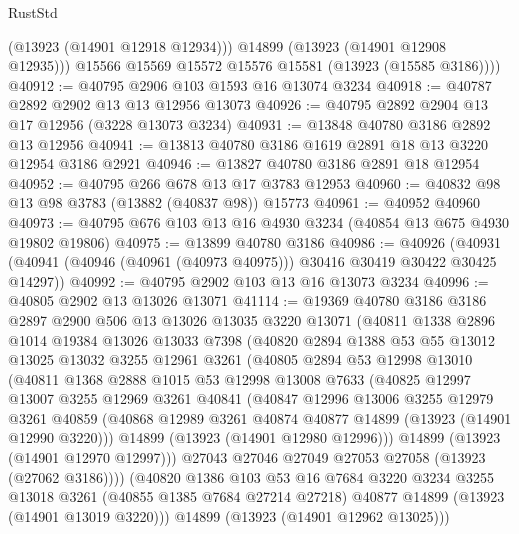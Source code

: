 \begin{lexlean}{RustStd}
\begin{coremodule}
            (@13923 (@14901 @12918 @12934)))
          @14899
          (@13923 (@14901 @12908 @12935)))
        @15566
        @15569
        @15572
        @15576
        @15581
        (@13923 (@15585 @3186))))
@40912 := @40795 @2906 @103 @1593 @16 @13074 @3234
@40918 := @40787 @2892 @2902 @13 @13 @12956 @13073
@40926 := @40795 @2892 @2904 @13 @17 @12956 (@3228 @13073 @3234)
@40931 := @13848 @40780 @3186 @2892 @13 @12956
@40941 := @13813 @40780 @3186 @1619 @2891 @18 @13 @3220 @12954 @3186 @2921
@40946 := @13827 @40780 @3186 @2891 @18 @12954
@40952 := @40795 @266 @678 @13 @17 @3783 @12953
@40960 := @40832 @98 @13 @98 @3783 (@13882 (@40837 @98)) @15773
@40961 := @40952 @40960
@40973 := @40795 @676 @103 @13 @16 @4930 @3234 (@40854 @13 @675 @4930 @19802 @19806)
@40975 := @13899 @40780 @3186
@40986 := @40926
    (@40931 (@40941 (@40946 (@40961 (@40973 @40975))) @30416 @30419 @30422 @30425 @14297))
@40992 := @40795 @2902 @103 @13 @16 @13073 @3234
@40996 := @40805 @2902 @13 @13026 @13071
@41114 := @19369
    @40780
    @3186
    @3186
    @2897
    @2900
    @506
    @13
    @13026
    @13035
    @3220
    @13071
    (@40811
      @1338
      @2896
      @1014
      @19384
      @13026
      @13033
      @7398
      (@40820
        @2894
        @1388
        @53
        @55
        @13012
        @13025
        @13032
        @3255
        @12961
        @3261
        (@40805
          @2894
          @53
          @12998
          @13010
          (@40811
            @1368
            @2888
            @1015
            @53
            @12998
            @13008
            @7633
            (@40825
              @12997
              @13007
              @3255
              @12969
              @3261
              @40841
              (@40847
                @12996
                @13006
                @3255
                @12979
                @3261
                @40859
                (@40868 @12989 @3261 @40874 @40877 @14899 (@13923 (@14901 @12990 @3220)))
                @14899
                (@13923 (@14901 @12980 @12996)))
              @14899
              (@13923 (@14901 @12970 @12997)))
            @27043
            @27046
            @27049
            @27053
            @27058
            (@13923 (@27062 @3186))))
        (@40820
          @1386
          @103
          @53
          @16
          @7684
          @3220
          @3234
          @3255
          @13018
          @3261
          (@40855 @1385 @7684 @27214 @27218)
          @40877
          @14899
          (@13923 (@14901 @13019 @3220)))
        @14899
        (@13923 (@14901 @12962 @13025)))

\end{coremodule}
\end{lexlean}
